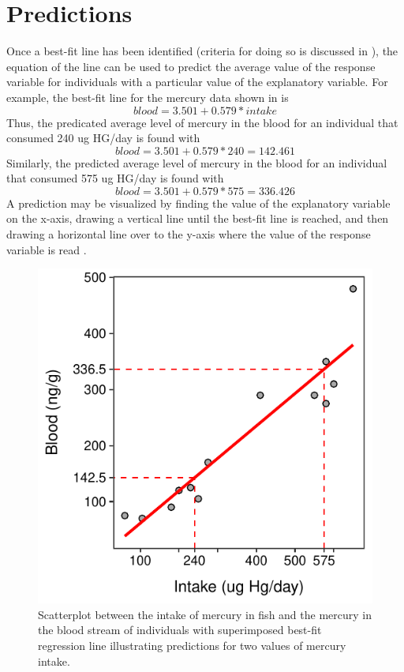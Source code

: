 \documentclass[10pt,openany]{book}\usepackage[]{graphicx}\usepackage[]{color}
\newenvironment{knitrout}{}{} %
\begin{document}
\section{Predictions}
Once a best-fit line has been identified (criteria for doing so is discussed in ), the equation of the line can be used to predict the average value of the response variable for individuals with a particular value of the explanatory variable. For example, the best-fit line for the mercury data shown in  is
  \[ blood = 3.501 + 0.579*intake \]
Thus, the predicated average level of mercury in the blood for an individual that consumed 240 ug HG/day is found with
  \[ blood = 3.501 + 0.579*240 = 142.461 \]
Similarly, the predicted average level of mercury in the blood for an individual that consumed 575 ug HG/day is found with
  \[ blood = 3.501 + 0.579*575 = 336.426 \]
A prediction may be visualized by finding the value of the explanatory variable on the x-axis, drawing a vertical line until the best-fit line is reached, and then drawing a horizontal line over to the y-axis where the value of the response variable is read .

\begin{knitrout}
\color{fgcolor}\begin{figure}[hbtp]

{\centering \includegraphics[width=.4\linewidth]{Figs/HGpredict-1} 

}

\caption[Scatterplot between the intake of mercury in fish and the mercury in the blood stream of individuals with superimposed best-fit regression line illustrating predictions for two values of mercury intake]{Scatterplot between the intake of mercury in fish and the mercury in the blood stream of individuals with superimposed best-fit regression line illustrating predictions for two values of mercury intake.}\label{fig:HGpredict}
\end{figure}


\end{knitrout}
\end{document}
